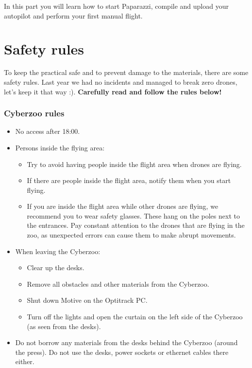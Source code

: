 \documentclass{article}
\begin{document}

In this part you will learn how to start Paparazzi, compile and upload your autopilot and perform your first manual flight.

\section{Safety rules}
To keep the practical safe and to prevent damage to the materials, there are some safety rules.
Last year we had no incidents and managed to break zero drones, let's keep it that way :).
\textbf{Carefully read and follow the rules below!}

\subsubsection*{Cyberzoo rules}
\begin{itemize}
\item No access after 18:00.
\item Persons inside the flying area:
\begin{itemize}
\item Try to avoid having people inside the flight area when drones are flying.
\item If there are people inside the flight area, notify them when you start flying.
\item If you are inside the flight area while other drones are flying, we recommend you to wear safety glasses. These hang on the poles next to the entrances. Pay constant attention to the drones that are flying in the zoo, as unexpected errors can cause them to make abrupt movements.
\end{itemize}
\item When leaving the Cyberzoo:
\begin{itemize}
\item Clear up the desks.
\item Remove all obstacles and other materials from the Cyberzoo.
\item Shut down Motive on the Optitrack PC.
\item Turn off the lights and open the curtain on the left side of the Cyberzoo (as seen from the desks).
\end{itemize}
\item Do not borrow any materials from the desks behind the Cyberzoo (around the press). Do not use the desks, power sockets or ethernet cables there either.
\end{itemize}
\end{document}

